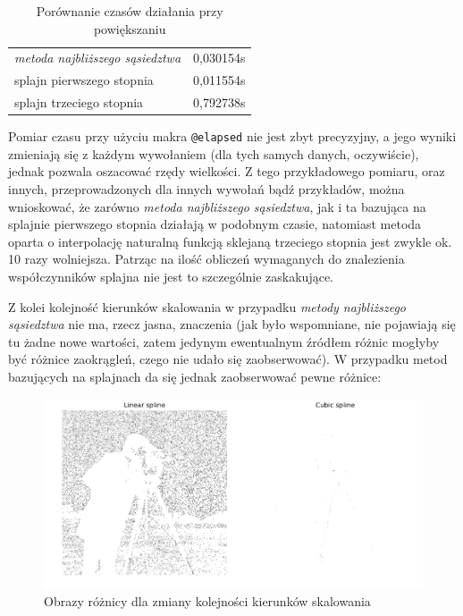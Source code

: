 \documentclass{article}
\begin{document}
\begin{table}[ht]
    \centering
    \begin{tabular}{|l|r|}
        \hline
        \textit{metoda najbliższego sąsiedztwa} & 0,030154s \\
        splajn pierwszego stopnia & 0,011554s \\
        splajn trzeciego stopnia & 0,792738s \\
        \hline
    \end{tabular}
    \caption{Porównanie czasów działania przy powiększaniu}
    \label{tab:cameraman-times}
\end{table}

Pomiar czasu przy użyciu makra \texttt{@elapsed} nie jest zbyt precyzyjny, a jego wyniki zmieniają się z każdym wywołaniem (dla tych samych danych, oczywiście), jednak pozwala oszacować rzędy wielkości. Z tego przykładowego pomiaru, oraz innych, przeprowadzonych dla innych wywołań bądź przykładów, można wnioskować, że zarówno \textit{metoda najbliższego sąsiedztwa}, jak i ta bazująca na splajnie pierwszego stopnia działają w podobnym czasie, natomiast metoda oparta o interpolację naturalną funkcją sklejaną trzeciego stopnia jest zwykle ok. 10 razy wolniejsza. Patrząc na ilość obliczeń wymaganych do znalezienia współczynników splajna nie jest to szczególnie zaskakujące.

Z kolei kolejność kierunków skalowania w przypadku \textit{metody najbliższego sąsiedztwa} nie ma, rzecz jasna, znaczenia (jak było wspomniane, nie pojawiają się tu żadne nowe wartości, zatem jedynym ewentualnym źródłem różnic mogłyby być różnice zaokrągleń, czego nie udało się zaobserwować). W przypadku metod bazujących na splajnach da się jednak zaobserwować pewne różnice:

\begin{figure}[ht]
    \centering
    \includegraphics[width=\textwidth]{images/cameraman-diff.png}
    \caption{Obrazy różnicy dla zmiany kolejności kierunków skalowania}
    \label{fig:cameraman-diff}
\end{figure}
\end{document}
